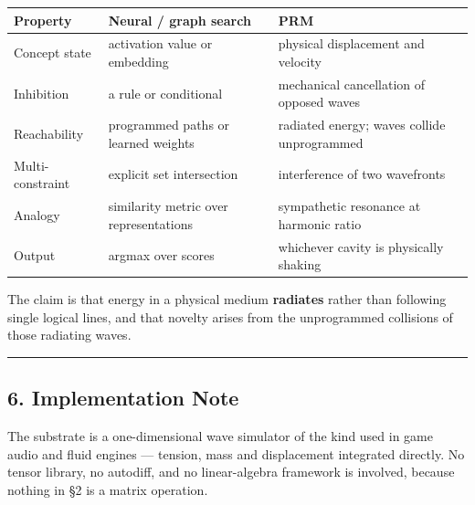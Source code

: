 \documentclass[
  11pt,
  a4paper,
]{article}
\begin{document}
\begin{longtable}[]{@{}
  >{\raggedright\arraybackslash}p{}
  >{\raggedright\arraybackslash}p{}
  >{\raggedright\arraybackslash}p{}@{}}
\toprule\noalign{}
\begin{minipage}[b]{\linewidth}\raggedright
Property
\end{minipage} & \begin{minipage}[b]{\linewidth}\raggedright
Neural / graph search
\end{minipage} & \begin{minipage}[b]{\linewidth}\raggedright
PRM
\end{minipage} \\
\midrule\noalign{}
\endhead
\bottomrule\noalign{}
\endlastfoot
Concept state & activation value or embedding & physical displacement
and velocity \\
Inhibition & a rule or conditional & mechanical cancellation of opposed
waves \\
Reachability & programmed paths or learned weights & radiated energy;
waves collide unprogrammed \\
Multi-constraint & explicit set intersection & interference of two
wavefronts \\
Analogy & similarity metric over representations & sympathetic resonance
at harmonic ratio \\
Output & argmax over scores & whichever cavity is physically shaking \\
\end{longtable}

The claim is that energy in a physical medium \textbf{radiates} rather
than following single logical lines, and that novelty arises from the
unprogrammed collisions of those radiating waves.

\begin{center}\rule{0.5\linewidth}{0.5pt}\end{center}

\subsection{6. Implementation Note}\label{implementation-note}

The substrate is a one-dimensional wave simulator of the kind used in
game audio and fluid engines --- tension, mass and displacement
integrated directly. No tensor library, no autodiff, and no
linear-algebra framework is involved, because nothing in §2 is a matrix
operation.
\end{document}
